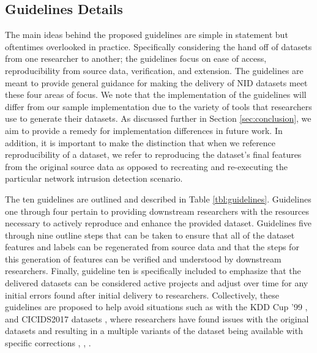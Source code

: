 \documentclass[conference]{IEEEtran}
\begin{document}
\subsection{Guidelines Details}\label{subsec:framework_overview}
The main ideas behind the proposed guidelines are simple in statement but oftentimes overlooked in practice.
Specifically considering the hand off of datasets from one researcher to another; the guidelines focus on ease of access, reproducibility from source data, verification, and extension.
The guidelines are meant to provide general guidance for making the delivery of NID datasets meet these four areas of focus.
We note that the implementation of the guidelines will differ from our sample implementation due to the variety of tools that researchers use to generate their datasets.
As discussed further in Section \ref{sec:conclusion}, we aim to provide a remedy for implementation differences in future work.
In addition, it is important to make the distinction that when we reference reproducibility of a dataset, we refer to reproducing the dataset's final features from the original source data as opposed to recreating and re-executing the particular network intrusion detection scenario.

The ten guidelines are outlined and described in Table \ref{tbl:guidelines}.
Guidelines one through four pertain to providing downstream researchers with the resources necessary to actively reproduce and enhance the provided dataset.
Guidelines five through nine outline steps that can be taken to ensure that all of the dataset features and labels can be regenerated from source data and that the steps for this generation of features can be verified and understood by downstream researchers.
Finally, guideline ten is specifically included to emphasize that the delivered datasets can be considered active projects and adjust over time for any initial errors found after initial delivery to researchers.
Collectively, these guidelines are proposed to help avoid situations such as with the KDD Cup '99 \cite{kdd99}, \cite{tavallaee2009detailed} and CICIDS2017 datasets \cite{sharafaldin2018toward}, where researchers have found issues with the original datasets and resulting in a multiple variants of the dataset being available with specific corrections \cite{tavallaee2009detailed}, \cite{lanvin:hal-03775466}, \cite{engelen2021}.
\end{document}
